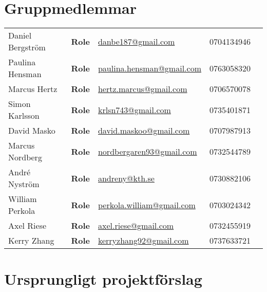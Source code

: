 \renewcommand{\appendixtocname}{Appendix}
\renewcommand{\appendixpagename}{Appendix}
\begin{appendices}
\section{Gruppmedlemmar}

\begin{tabular}{lllll}
  Daniel Bergström & \textbf{Role} & \href{mailto:danbe187@gmail.com}{danbe187@gmail.com} & 0704134946 \\
  Paulina Hensman & \textbf{Role} & \href{mailto:paulina.hensman@gmail.com}{paulina.hensman@gmail.com} & 0763058320 \\
  Marcus Hertz & \textbf{Role} & \href{mailto:hertz.marcus@gmail.com}{hertz.marcus@gmail.com} & 0706570078 \\
  Simon Karlsson & \textbf{Role} & \href{mailto:krlsn743@gmail.com}{krlsn743@gmail.com} & 0735401871 \\
  David Masko & \textbf{Role} & \href{mailto:david.maskoo@gmail.com}{david.maskoo@gmail.com} & 0707987913 \\
  Marcus Nordberg & \textbf{Role} & \href{mailto:nordbergaren93@gmail.com}{nordbergaren93@gmail.com} & 0732544789 \\
  André Nyström & \textbf{Role} & \href{mailto:crazybanana3255@gmail.com}{andreny@kth.se} & 0730882106 \\
  William Perkola & \textbf{Role} & \href{mailto:perkola.william@gmail.com}{perkola.william@gmail.com} & 0703024342 \\
  Axel Riese & \textbf{Role} & \href{mailto:axel.riese@gmail.com}{axel.riese@gmail.com} & 0732455919 \\
  Kerry Zhang & \textbf{Role} & \href{mailto:kerryzhang92@gmail.com}{kerryzhang92@gmail.com} & 0737633721 \\
\end{tabular}

\section{Ursprungligt projektförslag}

\end{appendices}
